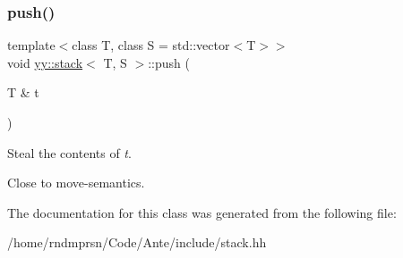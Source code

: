 \subsubsection{\texorpdfstring{push()}{push()}}
{\footnotesize\ttfamily template$<$class T, class S = std\+::vector$<$\+T$>$$>$ \\
void \hyperlink{classyy_1_1stack}{yy\+::stack}$<$ T, S $>$\+::push (\begin{DoxyParamCaption}\item[{T \&}]{t }\end{DoxyParamCaption})\hspace{0.3cm}{\ttfamily [inline]}}

Steal the contents of {\itshape t}.

Close to move-\/semantics. 

The documentation for this class was generated from the following file\+:\begin{DoxyCompactItemize}
\item 
/home/rndmprsn/\+Code/\+Ante/include/stack.\+hh\end{DoxyCompactItemize}
